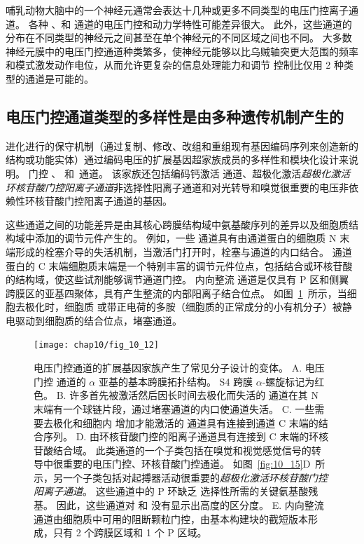 哺乳动物大脑中的一个神经元通常会表达十几种或更多不同类型的电压门控离子通道。
各种 、和  通道的电压门控和动力学特性可能差异很大。
此外，这些通道的分布在不同类型的神经元之间甚至在单个神经元的不同区域之间也不同。
大多数神经元膜中的电压门控通道种类繁多，使神经元能够以比乌贼轴突更大范围的频率和模式激发动作电位，从而允许更复杂的信息处理能力和调节 控制比仅用 2 种类型的通道是可能的。



\subsection{电压门控通道类型的多样性是由多种遗传机制产生的}

进化进行的保守机制（通过复制、修改、改组和重组现有基因编码序列来创造新的结构或功能实体）通过编码电压的扩展基因超家族成员的多样性和模块化设计来说明。 
门控 、 和~通道。
该家族还包括编码钙激活  通道、超极化激活\textit{超极化激活环核苷酸门控阳离子通道}非选择性阳离子通道和对光转导和嗅觉很重要的电压非依赖性环核苷酸门控阳离子通道的基因。


这些通道之间的功能差异是由其核心跨膜结构域中氨基酸序列的差异以及细胞质结构域中添加的调节元件产生的。 
例如，一些  通道具有由通道蛋白的细胞质 N 末端形成的栓塞介导的失活机制，当激活门打开时，栓塞与通道的内口结合。
通道蛋白的 C 末端细胞质末端是一个特别丰富的调节元件位点，包括结合或环核苷酸的结构域，使这些试剂能够调节通道门控。
内向整流  通道是仅具有 P 区和侧翼跨膜区的亚基四聚体，具有产生整流的内部阳离子结合位点。
如图~\ref{fig:10_12}~所示，当细胞去极化时，细胞质  或带正电荷的多胺（细胞质的正常成分的小有机分子）被静电驱动到细胞质的结合位点，堵塞通道。


\begin{figure}[htbp]
	\centering
	\texttt{[image: chap10/fig\_10\_12]}
	\caption{电压门控通道的扩展基因家族产生了常见分子设计的变体。
		A. 电压门控  通道的 $\alpha$ 亚基的基本跨膜拓扑结构。
		S4 跨膜 $\alpha$-螺旋标记为红色。
		B. 许多首先被激活然后因长时间去极化而失活的  通道在其 N 末端有一个球链片段，通过堵塞通道的内口使通道失活。
		C. 一些需要去极化和细胞内  增加才能激活的  通道具有连接到通道 C 末端的结合序列。
		D. 由环核苷酸门控的阳离子通道具有连接到 C 末端的环核苷酸结合域。
		此类通道的一个子类包括在嗅觉和视觉感觉信号的转导中很重要的电压门控、环核苷酸门控通道。
		如图~\ref{fig:10_15}D~所示，另一个子类包括对起搏器活动很重要的\textit{超极化激活环核苷酸门控阳离子通道}。
		这些通道中的 P 环缺乏  选择性所需的关键氨基酸残基。
		因此，这些通道对  和  没有显示出高度的区分度。
		E. 内向整流  通道由细胞质中可用的阻断颗粒门控，由基本构建块的截短版本形成，只有 2 个跨膜区域和 1 个 P 区域。}
	\label{fig:10_12}
\end{figure}


